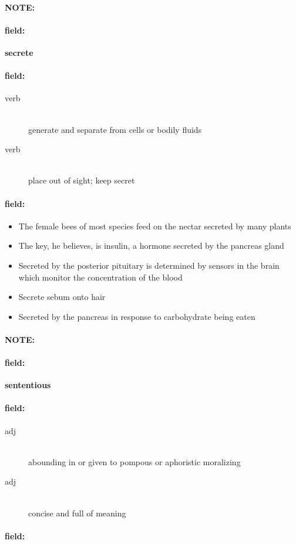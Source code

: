 \documentclass[12pt]{article}
\newenvironment{note}{\paragraph{NOTE:}}{}
\newenvironment{field}{\paragraph{field:}}{}
\begin{document}
\begin{note}
\begin{field}
\textbf{\large secrete}
\end{field}


\begin{field}
\begin{description}
\item[verb] \hfill \\ 
generate and separate from cells or bodily fluids

\item[verb] \hfill \\ 
place out of sight; keep secret

\end{description}
\end{field}

\begin{field}
\begin{itemize}
\item The female bees of most species feed on the nectar secreted by many plants
\item The key, he believes, is insulin, a hormone secreted by the pancreas gland
\item Secreted by the posterior pituitary is determined by sensors in the brain which monitor the concentration of the blood
\item Secrete sebum onto hair
\item Secreted by the pancreas in response to carbohydrate being eaten
\end{itemize}
\end{field}
\end{note}
\begin{note}
\begin{field}
\textbf{\large sententious}
\end{field}


\begin{field}
\begin{description}
\item[adj] \hfill \\ 
abounding in or given to pompous or aphoristic moralizing

\item[adj] \hfill \\ 
concise and full of meaning

\end{description}
\end{field}

\begin{field}
\end{field}
\end{note}
\end{document}
